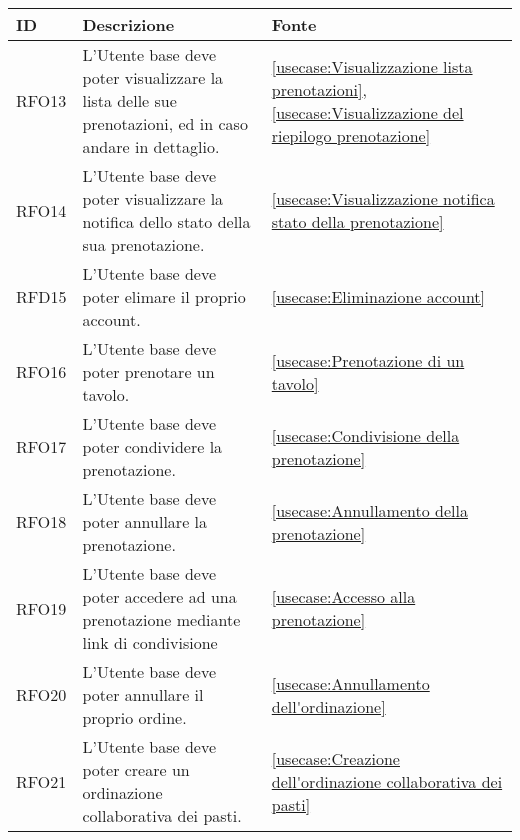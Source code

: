 \begin{table}[H]
	\renewcommand{\arraystretch}{1.5}
	\centering
	\begin{tabularx}{\textwidth}{l|X|p{2cm}}
		\textbf{ID} & \textbf{Descrizione}                                                                                           & \textbf{Fonte}                                                              \\
		\hline
		RFO13       & L'Utente base deve poter visualizzare la lista delle sue prenotazioni, ed in caso andare in dettaglio.          & \autoref{usecase:Visualizzazione lista prenotazioni}, \autoref{usecase:Visualizzazione del riepilogo prenotazione}                \\
		\hline
		RFO14       & L'Utente base deve poter visualizzare la notifica dello stato della sua prenotazione.                          & \autoref{usecase:Visualizzazione notifica stato della prenotazione}         \\
		\hline
		RFD15       & L'Utente base deve poter elimare il proprio account.                                                           & \autoref{usecase:Eliminazione account}                                      \\
		\hline
		RFO16       & L'Utente base deve poter prenotare un tavolo.                                                                  & \autoref{usecase:Prenotazione di un tavolo}                                 \\
		\hline
		RFO17       & L'Utente base deve poter condividere la prenotazione.                                                          & \autoref{usecase:Condivisione della prenotazione}                           \\
		\hline
		RFO18       & L'Utente base deve poter annullare la prenotazione.                                                            & \autoref{usecase:Annullamento della prenotazione}                           \\
		\hline
		RFO19       & L'Utente base deve poter accedere ad una prenotazione mediante link di condivisione                            & \autoref{usecase:Accesso alla prenotazione}                                 \\
		\hline
		RFO20       & L'Utente base deve poter annullare il proprio ordine.                                                          & \autoref{usecase:Annullamento dell'ordinazione}                             \\
		\hline
		RFO21       & L'Utente base deve poter creare un ordinazione collaborativa dei pasti.                                        & \autoref{usecase:Creazione dell'ordinazione collaborativa dei pasti}        \\

\end{tabularx}
\end{table}
